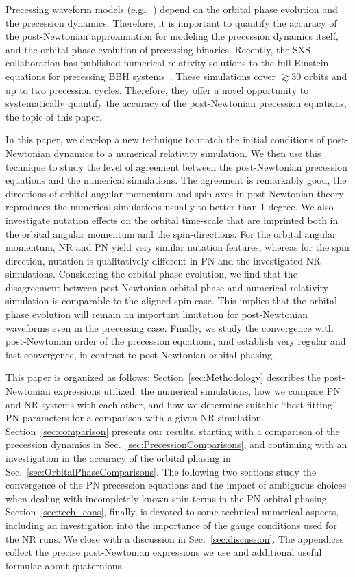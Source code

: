 \documentclass[aps,prd,amsmath,floatfix,twocolumn,superscriptaddress,nofootinbib,showpacs]{revtex4-1}
\begin{document}
Precessing waveform models (e.g.,~\cite{Hannam:2013oca,
  Taracchini:2013rva, Pan:2013rra, BoyleEtAl:2014}) depend on the
orbital phase evolution and the precession dynamics.  Therefore, it is
important to quantify the accuracy of the post-Newtonian approximation
for modeling the precession dynamics itself, and the orbital-phase
evolution of precessing binaries.  Recently, the SXS collaboration has
published numerical-relativity solutions to the full Einstein
equations for precessing BBH systems~\cite{PhysRevLett.111.241104}.
These simulations cover $\gtrsim 30$ orbits and up to two precession
cycles.  Therefore, they offer a novel opportunity to systematically
quantify the accuracy of the post-Newtonian precession equations, the
topic of this paper.

In this paper, we develop a new technique to match the initial
conditions of post-Newtonian dynamics to a numerical relativity
simulation.  We then use this technique to study the level of
agreement between the post-Newtonian precession equations and the
numerical simulations.  The agreement is remarkably good, the
directions of orbital angular momentum and spin axes in post-Newtonian
theory reproduces the numerical simulations usually to better than $1$
degree.  We also investigate nutation effects on the orbital
time-scale that are imprinted both in the orbital angular momentum and
the spin-directions.  For the orbital angular momentum, NR and PN
yield very similar nutation features, whereas for the spin direction,
nutation is qualitatively different in PN and the investigated NR
simulations.  Considering the orbital-phase evolution, we find that
the disagreement between post-Newtonian orbital phase and numerical
relativity simulation is comparable to the aligned-spin case. This
implies that the orbital phase evolution will remain an important
limitation for post-Newtonian waveforms even in the precessing case.
Finally, we study the convergence with post-Newtonian order of the
precession equations, and establish very regular and fast convergence,
in contrast to post-Newtonian orbital phasing.

This paper is organized as follows: Section~\ref{sec:Methodology}
describes the post-Newtonian expressions utilized, the numerical
simulations, how we compare PN and NR systems with each other, and how
we determine suitable ``best-fitting'' PN parameters for a comparison
with a given NR simulation.  Section~\ref{sec:comparison} presents our
results, starting with a comparison of the precession dynamics
in Sec.~\ref{sec:PrecessionComparisons}, and continuing with an
investigation in the accuracy of the orbital phasing in
Sec.~\ref{sec:OrbitalPhaseComparisons}.  The following two sections
study the convergence of the PN precession equations and the impact of
ambiguous choices when dealing with incompletely known spin-terms in
the PN orbital phasing.  Section~\ref{sec:tech_cons}, finally, is
devoted to some technical numerical aspects, including an
investigation into the importance of the gauge conditions used for the
NR runs.  We close with a discussion in Sec.~\ref{sec:discussion}.
The appendices collect the precise post-Newtonian expressions we use
and additional useful formulae about quaternions.
\end{document}
